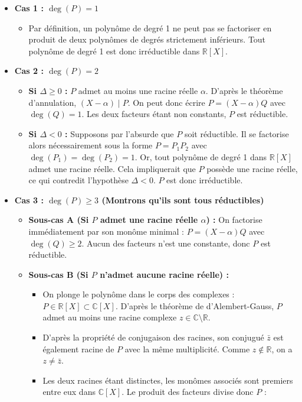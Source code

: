 \documentclass[11pt, a4paper]{article}
\theoremstyle{definition}
\begin{document}
\begin{itemize}
\item \textbf{Cas 1 : $\deg(P) = 1$}
\begin{itemize}
\item Par définition, un polynôme de degré 1 ne peut pas se factoriser en produit de deux polynômes de degrés strictement inférieurs. Tout polynôme de degré 1 est donc irréductible dans $\mathbb{R}[X]$.
\end{itemize}
\item \textbf{Cas 2 : $\deg(P) = 2$}
\begin{itemize}
\item \textbf{Si $\Delta \ge 0$ :} $P$ admet au moins une racine réelle $\alpha$. D'après le théorème d'annulation, $(X-\alpha) \mid P$. On peut donc écrire $P = (X-\alpha)Q$ avec $\deg(Q)=1$. Les deux facteurs étant non constants, $P$ est réductible.
\item \textbf{Si $\Delta < 0$ :} Supposons par l'absurde que $P$ soit réductible. Il se factorise alors nécessairement sous la forme $P = P_1 P_2$ avec $\deg(P_1)=\deg(P_2)=1$. Or, tout polynôme de degré 1 dans $\mathbb{R}[X]$ admet une racine réelle. Cela impliquerait que $P$ possède une racine réelle, ce qui contredit l'hypothèse $\Delta < 0$. $P$ est donc irréductible.
\end{itemize}
\item \textbf{Cas 3 : $\deg(P) \ge 3$ (Montrons qu'ils sont tous réductibles)}
\begin{itemize}
\item \textbf{Sous-cas A (Si $P$ admet une racine réelle $\alpha$) :} On factorise immédiatement par son monôme minimal : $P = (X-\alpha)Q$ avec $\deg(Q) \ge 2$. Aucun des facteurs n'est une constante, donc $P$ est réductible.
\item \textbf{Sous-cas B (Si $P$ n'admet aucune racine réelle) :}
\begin{itemize}
	\item On plonge le polynôme dans le corps des complexes : $P \in \mathbb{R}[X] \subset \mathbb{C}[X]$. D'après le théorème de d'Alembert-Gauss, $P$ admet au moins une racine complexe $z \in \mathbb{C} \setminus \mathbb{R}$.
	\item D'après la propriété de conjugaison des racines, son conjugué $\bar{z}$ est également racine de $P$ avec la même multiplicité. Comme $z \notin \mathbb{R}$, on a $z \neq \bar{z}$.
	\item Les deux racines étant distinctes, les monômes associés sont premiers entre eux dans $\mathbb{C}[X]$. Le produit des facteurs divise donc $P$ :

\end{itemize}
\end{itemize}
\end{itemize}
\end{document}

